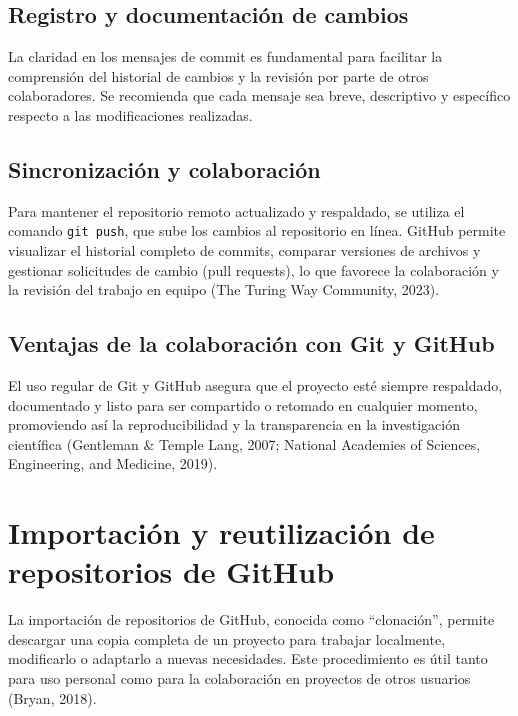 \documentclass[
  spanish,
  a4paper,
  DIV=11,
  numbers=noendperiod,
  onepage,
  openany]{scrreprt}
\begin{document}
\subsection{Registro y documentación de
cambios}\label{registro-y-documentaciuxf3n-de-cambios}

La claridad en los mensajes de commit es fundamental para facilitar la
comprensión del historial de cambios y la revisión por parte de otros
colaboradores. Se recomienda que cada mensaje sea breve, descriptivo y
específico respecto a las modificaciones realizadas.

\subsection{Sincronización y
colaboración}\label{sincronizaciuxf3n-y-colaboraciuxf3n}

Para mantener el repositorio remoto actualizado y respaldado, se utiliza
el comando \texttt{git\ push}, que sube los cambios al repositorio en
línea. GitHub permite visualizar el historial completo de commits,
comparar versiones de archivos y gestionar solicitudes de cambio (pull
requests), lo que favorece la colaboración y la revisión del trabajo en
equipo (The Turing Way Community, 2023).

\subsection{Ventajas de la colaboración con Git y
GitHub}\label{ventajas-de-la-colaboraciuxf3n-con-git-y-github}

El uso regular de Git y GitHub asegura que el proyecto esté siempre
respaldado, documentado y listo para ser compartido o retomado en
cualquier momento, promoviendo así la reproducibilidad y la
transparencia en la investigación científica (Gentleman \& Temple Lang,
2007; National Academies of Sciences, Engineering, and Medicine, 2019).

\section{Importación y reutilización de repositorios de
GitHub}\label{importaciuxf3n-y-reutilizaciuxf3n-de-repositorios-de-github}

La importación de repositorios de GitHub, conocida como ``clonación'',
permite descargar una copia completa de un proyecto para trabajar
localmente, modificarlo o adaptarlo a nuevas necesidades. Este
procedimiento es útil tanto para uso personal como para la colaboración
en proyectos de otros usuarios (Bryan, 2018).
\end{document}
